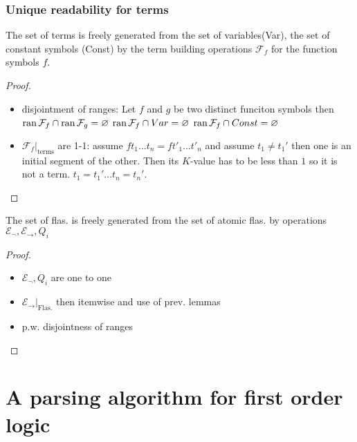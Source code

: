 \subsubsection{Unique readability for terms}
The set of terms is freely generated from the set of variables(Var), the set of constant symbols (Const) by the term building operations $\mathcal{F}_f$ for the function symbols $f$.
\begin{proof}
    
     \begin{itemize}
        \item disjointment of ranges: Let $f$ and $g$ be two distinct funciton symbols then $\operatorname{ran}\mathcal{F}_f \cap \operatorname{ran}\mathcal{F}_g =\varnothing$
        $\operatorname{ran}\mathcal{F}_f \cap Var =\varnothing$
        $\operatorname{ran}\mathcal{F}_f \cap Const =\varnothing$
        \item $\mathcal{F}_f|_{\text{terms}}$ are 1-1:
        assume $ft_1\dots t_n = f t'_1\dots t'_n$ and assume $t_1 \neq t_1'$ then one is an initial segment of the other.
        Then its $K$-value has to be less than $1$ so it is not a term.
        $t_1 = t_1' \dots t_n=t_n'$.
     \end{itemize}
\end{proof}
The set of flas. is freely generated from the set of atomic flas. by operations $\mathcal{E}_\lnot,\mathcal{E}_\to,Q_i$
\begin{proof}
    \begin{itemize}
        \item $\mathcal{E}_\lnot,Q_i$ are one to one
        \item $\mathcal{E}_\to|_{\text{Flas.}}$ then itemwise and use of prev. lemmas
        \item p.w. disjointness of ranges
    \end{itemize}
\end{proof}

\section{A parsing algorithm for first order logic}

